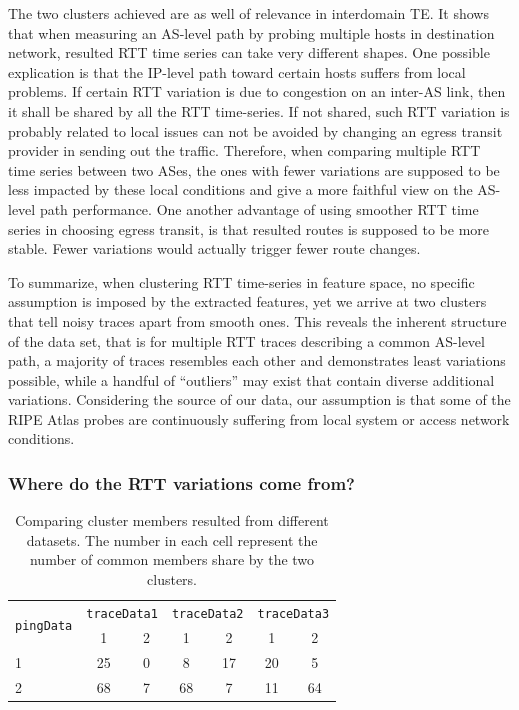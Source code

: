 The two clusters achieved are as well of relevance in interdomain TE. 
It shows that when measuring an AS-level path by probing multiple hosts in destination network, resulted RTT time series can take very different shapes. 
One possible explication is that the IP-level path toward certain hosts suffers from local problems.
If certain RTT variation is due to congestion on an inter-AS link, then it shall be shared by all the RTT time-series. If not shared, such RTT variation is probably related to local issues can not be avoided by changing an egress transit provider in sending out the traffic.
Therefore, when comparing multiple RTT time series between two ASes, the ones with fewer variations are supposed to be less impacted by these local conditions and give a more faithful view on the AS-level path performance.
One another advantage of using smoother RTT time series in choosing egress transit, is that resulted routes is supposed to be more stable. Fewer variations would actually trigger fewer route changes. 

To summarize, when clustering RTT time-series in feature space, no specific assumption is imposed by the extracted features, yet we arrive at two clusters that tell noisy traces apart from smooth ones.
This reveals the inherent structure of the data set, that is for multiple RTT traces describing a common AS-level path, a majority of traces resembles each other and demonstrates least variations possible, while a handful of ``outliers'' may exist that contain diverse additional variations. 
Considering the source of our data, our assumption is that some of the RIPE Atlas probes are continuously suffering from local system or access network conditions. 

\subsubsection{Where do the RTT variations come from?}

\begin{table}[!htb]
\centering
\footnotesize
\setlength{\tabcolsep}{0.5em}
\begin{tabular}{l|cc|cc|cc}
\toprule
\multirow{2}{*}{\texttt{pingData}} & \multicolumn{2}{c|}{\texttt{traceData1}} & \multicolumn{2}{c|}{\texttt{traceData2}} & \multicolumn{2}{c}{\texttt{traceData3}}\\
 &  1 & 2 & 1 & 2 & 1 & 2\\
\midrule
1 & 25 & 0 & 8 & 17 & 20 & 5 \\
2 & 68 & 7 & 68 & 7 & 11 & 64 \\
\bottomrule
\end{tabular}
\caption{Comparing cluster members resulted from different datasets. The number in each cell represent the number of common members share by the two clusters.}
\label{tab:comp_cls}
\end{table}

